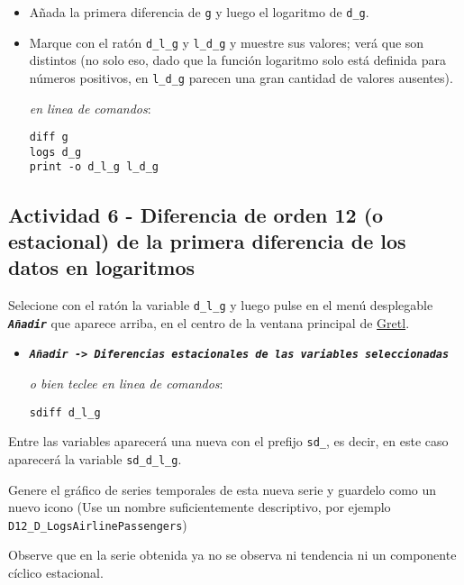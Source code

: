 \documentclass[11pt]{article}
\begin{document}
\begin{itemize}
\item Añada la primera diferencia de \texttt{g} y luego el logaritmo de \texttt{d\_g}.
\item Marque con el ratón \texttt{d\_l\_g} y \texttt{l\_d\_g} y muestre sus valores; verá
que son distintos (no solo eso, dado que la función logaritmo solo
está definida para números positivos, en \texttt{l\_d\_g} parecen una gran
cantidad de valores ausentes).

{\vspace{0pt} \footnotesize \color{gray!70!black}
\emph{en linea de comandos}: 
\begin{verbatim}
diff g
logs d_g
print -o d_l_g l_d_g
\end{verbatim}
}
\end{itemize}

\subsection{Actividad 6 - Diferencia de orden 12 (o estacional) de la primera diferencia de los datos en logaritmos}
\label{sec:org831b7a5}
Selecione con el ratón la variable \texttt{d\_l\_g} y luego pulse en el menú desplegable \textbf{\emph{\texttt{Añadir}}} que aparece arriba, en el centro de la
ventana principal de \href{https://gretl.sourceforge.net/es.html}{Gretl}.
\begin{itemize}
\item \textbf{\emph{\texttt{Añadir -> Diferencias estacionales de las variables seleccionadas}}}

{\vspace{0pt} \footnotesize \color{gray!70!black}
\emph{o bien teclee en linea de comandos}: 
\begin{verbatim}
sdiff d_l_g
\end{verbatim}
}
\end{itemize}

Entre las variables aparecerá una nueva con el prefijo \texttt{sd\_}, es
decir, en este caso aparecerá la variable \texttt{sd\_d\_l\_g}.

Genere el gráfico de series temporales de esta nueva serie y guardelo
como un nuevo icono (Use un nombre suficientemente descriptivo, por
ejemplo \texttt{D12\_D\_LogsAirlinePassengers})

{\vspace{0pt} \footnotesize \color{gray!70!black}
}

Observe que en la serie obtenida ya no se observa ni tendencia ni un
componente cíclico estacional.
\end{document}
